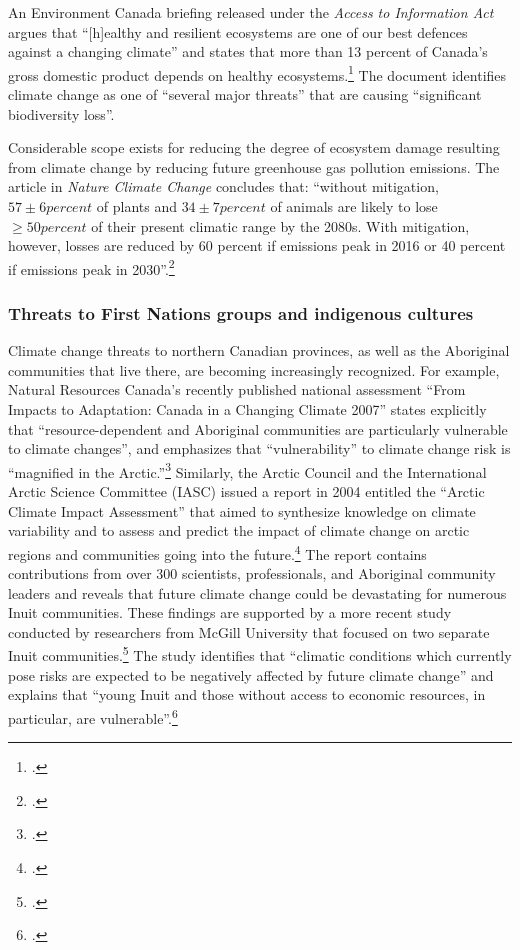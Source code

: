 An Environment Canada briefing released under the \emph{Access to Information Act} argues that ``[h]ealthy and resilient ecosystems are one of our best defences against a changing climate'' and states that more than 13 percent of Canada's gross domestic product depends on healthy ecosystems.\footcite[][]{CanadaEcosystemBriefing}
The document identifies climate change as one of ``several major threats'' that are causing ``significant biodiversity loss''.




Considerable scope exists for reducing the degree of ecosystem damage resulting from climate change by reducing future greenhouse gas pollution emissions.
The article in \emph{Nature Climate Change} concludes that: ``without mitigation, $57 \pm 6 percent$ of plants and $34 \pm 7 percent$ of animals are likely to lose $\ge 50 percent$ of their present climatic range by the 2080s. With mitigation, however, losses are reduced by 60 percent if emissions peak in 2016 or 40 percent if emissions peak in 2030''.\footcite[][]{WarrenBiodiversity}



	\subsubsection{Threats to First Nations groups and indigenous cultures}



Climate change threats to northern Canadian provinces, as well as the Aboriginal communities that live there, are becoming increasingly recognized. 
For example, Natural Resources Canada's recently published national assessment ``From Impacts to Adaptation: Canada in a Changing Climate 2007'' states explicitly that ``resource-dependent and Aboriginal communities are particularly vulnerable to climate changes'', and emphasizes that ``vulnerability'' to climate change risk is ``magnified in the Arctic.''\footcite[][p.3, p. 14]{ImpToAda} 
Similarly, the Arctic Council and the International Arctic Science Committee (IASC) issued a report in 2004 entitled the ``Arctic Climate Impact Assessment'' that aimed  to synthesize knowledge on climate variability and to assess and predict the impact of climate change on arctic regions and communities going into the future.\footcite[][]{ACIA2004}
The report contains contributions from over 300 scientists, professionals, and Aboriginal community leaders and reveals that future climate change could be devastating for numerous Inuit communities.
These findings are supported by a more recent study conducted by researchers from McGill University that focused on two separate Inuit communities.\footcite[][]{CCInuitCommunities}
The study identifies that ``climatic conditions which currently pose risks are expected to be negatively affected by future climate change'' and explains that ``young Inuit and those without access to economic resources, in particular, are vulnerable''.\footcite[][p. 45, p. 54]{CCInuitCommunities}



